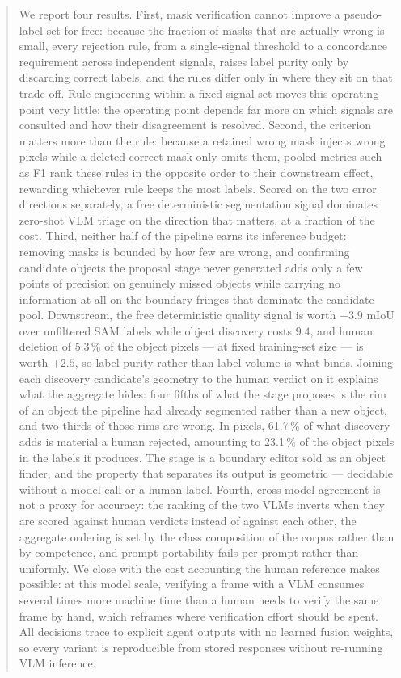 \documentclass[conference]{IEEEtran}
\begin{document}
\begin{abstract}
We report four results.
First, mask verification cannot improve a pseudo-label set for free: because the fraction of masks that are actually wrong is small, every rejection rule, from a single-signal threshold to a concordance requirement across independent signals, raises label purity only by discarding correct labels, and the rules differ only in where they sit on that trade-off.
Rule engineering within a fixed signal set moves this operating point very little; the operating point depends far more on which signals are consulted and how their disagreement is resolved.
Second, the criterion matters more than the rule: because a retained wrong mask injects wrong pixels while a deleted correct mask only omits them, pooled metrics such as F1 rank these rules in the opposite order to their downstream effect, rewarding whichever rule keeps the most labels.
Scored on the two error directions separately, a free deterministic segmentation signal dominates zero-shot VLM triage on the direction that matters, at a fraction of the cost.
Third, neither half of the pipeline earns its inference budget: removing masks is bounded by how few are wrong, and confirming candidate objects the proposal stage never generated adds only a few points of precision on genuinely missed objects while carrying no information at all on the boundary fringes that dominate the candidate pool. Downstream, the free deterministic quality signal is worth $+3.9$ mIoU over unfiltered SAM labels while object discovery costs $9.4$, and human deletion of 5.3\,\% of the object pixels --- at fixed training-set size --- is worth $+2.5$, so label purity rather than label volume is what binds.
Joining each discovery candidate's geometry to the human verdict on it explains what the aggregate hides: four fifths of what the stage proposes is the rim of an object the pipeline had already segmented rather than a new object, and two thirds of those rims are wrong. In pixels, 61.7\,\% of what discovery adds is material a human rejected, amounting to 23.1\,\% of the object pixels in the labels it produces. The stage is a boundary editor sold as an object finder, and the property that separates its output is geometric --- decidable without a model call or a human label.
Fourth, cross-model agreement is not a proxy for accuracy: the ranking of the two VLMs inverts when they are scored against human verdicts instead of against each other, the aggregate ordering is set by the class composition of the corpus rather than by competence, and prompt portability fails per-prompt rather than uniformly.
We close with the cost accounting the human reference makes possible: at this model scale, verifying a frame with a VLM consumes several times more machine time than a human needs to verify the same frame by hand, which reframes where verification effort should be spent.
All decisions trace to explicit agent outputs with no learned fusion weights, so every variant is reproducible from stored responses without re-running VLM inference.
\end{abstract}
\end{document}
